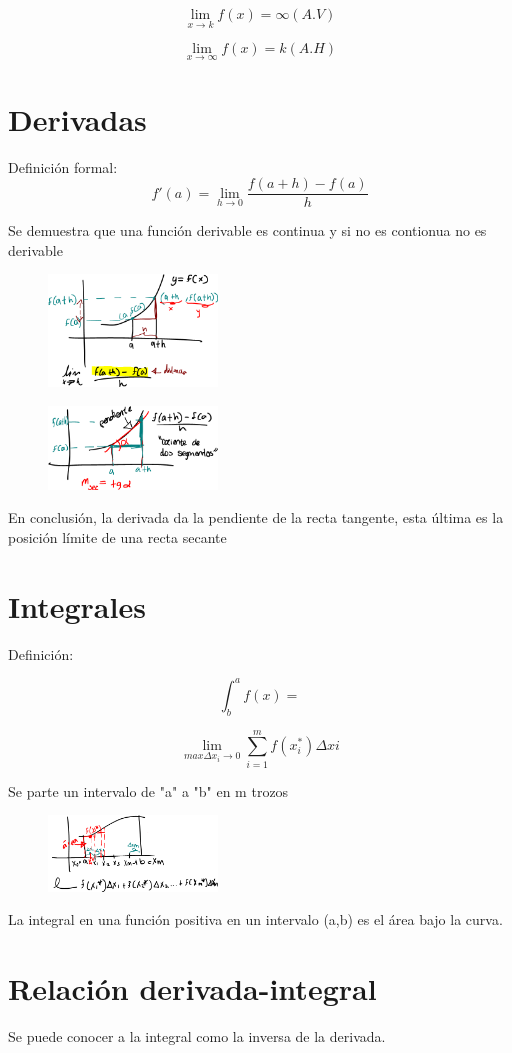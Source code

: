 \documentclass[letterpaper,12pt]{article}
\begin{document}
\begin{sloppypar}
$$\lim_{x \to k} f(x) = \infty (A.V)$$

$$\lim_{x \to \infty} f(x) = k (A.H)$$

\section{Derivadas}
Definición formal: 
$$f' (a) = \lim_{h \to 0} \frac{f(a + h) - f(a)}{h}$$

Se demuestra que una función derivable es continua y si no es contionua no es derivable
\begin{figure}[H]
    \centering
    \includegraphics[width=0.4\textwidth]{images/derv.PNG}
\end{figure}
\begin{figure}[H]
    \centering
    \includegraphics[width=0.4\textwidth]{images/derv2.PNG}
\end{figure}
En conclusión, la derivada da la pendiente de la recta tangente, esta última es la posición límite de una recta secante

\section{Integrales}
Definición:

\begin{center}
    $$\int_{b}^{a} f(x) = $$

    $$\displaystyle \lim_{max \Delta x_i \to 0} \sum_{i = 1}^{m} f(x_i^{*}) \Delta xi$$
\end{center}
Se parte un intervalo de "a" a "b" en m trozos 
\begin{figure}[H]
    \centering
    \includegraphics[width=0.4\textwidth]{images/int.PNG}
\end{figure}
La integral en una función positiva en un intervalo (a,b) es el área bajo la curva. 
\section{Relación derivada-integral}
Se puede conocer a la integral como la inversa de la derivada.


\end{sloppypar}
\end{document}
